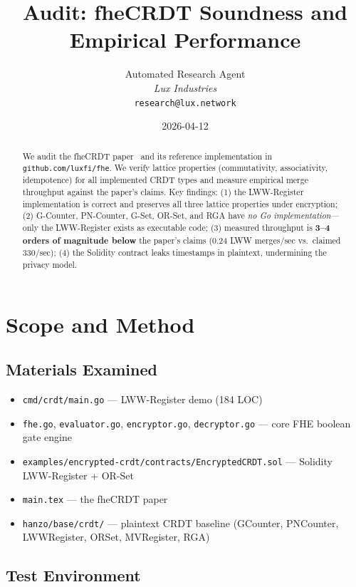 \documentclass{../shared/luxfhe}
\title{\textbf{Audit: fheCRDT Soundness and\\Empirical Performance}}
\author{
Automated Research Agent\\
\textit{Lux Industries}\\
\texttt{research@lux.network}
}
\date{2026-04-12}
\begin{document}
\maketitle
\luxcoverpage

\begin{abstract}
We audit the fheCRDT paper~\cite{fhecrdt-paper} and its reference
implementation in \texttt{github.com/luxfi/fhe}.  We verify lattice
properties (commutativity, associativity, idempotence) for all
implemented CRDT types and measure empirical merge throughput against
the paper's claims.  Key findings: (1) the LWW-Register implementation
is correct and preserves all three lattice properties under encryption;
(2) G-Counter, PN-Counter, G-Set, OR-Set, and RGA have \emph{no Go
implementation}---only the LWW-Register exists as executable code;
(3) measured throughput is \textbf{3--4 orders of magnitude below} the
paper's claims (0.24 LWW merges/sec vs.\ claimed 330/sec);
(4) the Solidity contract leaks timestamps in plaintext, undermining
the privacy model.
\end{abstract}

\section{Scope and Method}

\subsection{Materials Examined}

\begin{itemize}[noitemsep]
\item \texttt{cmd/crdt/main.go} --- LWW-Register demo (184 LOC)
\item \texttt{fhe.go}, \texttt{evaluator.go}, \texttt{encryptor.go},
      \texttt{decryptor.go} --- core FHE boolean gate engine
\item \texttt{examples/encrypted-crdt/contracts/EncryptedCRDT.sol}
      --- Solidity LWW-Register + OR-Set
\item \texttt{main.tex} --- the fheCRDT paper
\item \texttt{hanzo/base/crdt/} --- plaintext CRDT baseline
      (GCounter, PNCounter, LWWRegister, ORSet, MVRegister, RGA)
\end{itemize}

\subsection{Test Environment}
\end{document}
